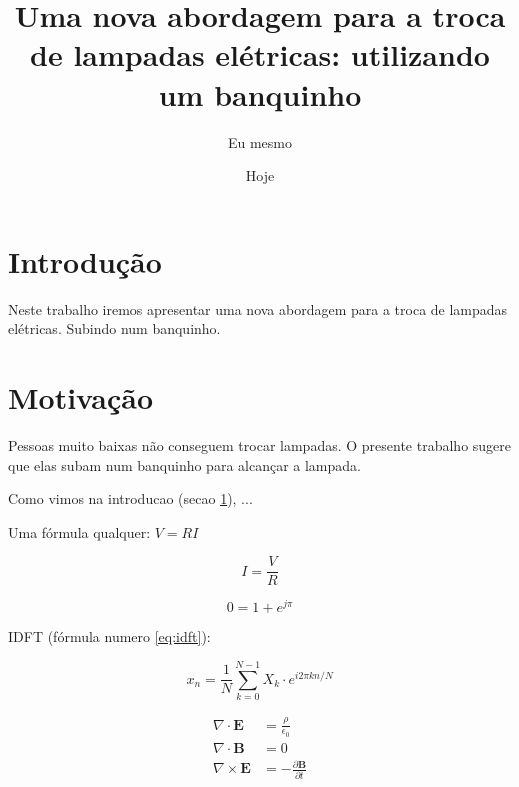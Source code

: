 \documentclass{article}
\author{Eu mesmo}
\date{Hoje}
\title{Uma nova abordagem para a troca de
       lampadas elétricas: utilizando um banquinho}
\newcommand{\vetor}[1]{\textbf{#1}}
\begin{document}
\maketitle

\newpage

\section{Introdução}
\label{sec:intro}

Neste trabalho  iremos apresentar uma nova abordagem
para a troca  de lampadas elétricas.
Subindo  num  banquinho. %


\section{Motivação}
\label{sec:motiv}

Pessoas muito baixas não conseguem trocar lampadas.
O presente trabalho sugere que elas subam num
banquinho para alcançar a lampada.

Como vimos na introducao (secao \ref{sec:intro}),
...

Uma fórmula qualquer: $V=R I$

$$I = \frac{V}{R}$$

$$0=1+e^{j\pi}$$

IDFT (fórmula numero \ref{eq:idft}):

\begin{equation}
\label{eq:idft}
x_n = \frac{1}{N}
\sum_{k=0}^{N-1} X_k \cdot
e^{i2\pi kn/N}
\end{equation}

\begin{align}
\nabla \cdot \vetor{E} & = \frac{\rho}{\epsilon_0} \\
\nabla \cdot \vetor{B} & = 0 \\
\nabla \times \vetor{E}
& = - \frac{\partial \vetor{B}}{\partial t}
\end{align}
\end{document}
